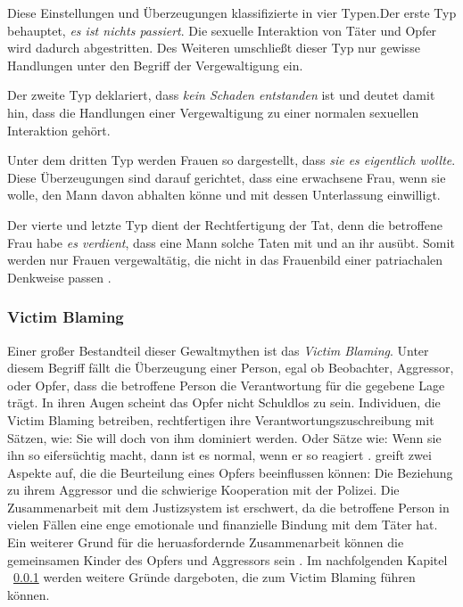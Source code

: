 Diese Einstellungen und Überzeugungen klassifizierte \textcite{Vergewaltigung_Typen_Burt_1991} in vier Typen.Der erste Typ behauptet, \textit{es ist nichts passiert}. Die sexuelle Interaktion von Täter und Opfer wird dadurch abgestritten. Des Weiteren umschließt dieser Typ nur gewisse Handlungen unter den Begriff der Vergewaltigung ein. 

Der zweite Typ deklariert, dass \textit{kein Schaden entstanden} ist und deutet damit hin, dass die Handlungen einer Vergewaltigung zu einer normalen sexuellen Interaktion gehört.

Unter dem dritten Typ werden Frauen so dargestellt, dass \textit{sie es eigentlich wollte}. Diese Überzeugungen sind darauf gerichtet, dass eine erwachsene Frau, wenn sie wolle, den Mann davon abhalten könne und mit dessen Unterlassung einwilligt.

Der vierte und letzte Typ dient der Rechtfertigung der Tat, denn die betroffene Frau habe \textit{es verdient}, dass eine Mann solche Taten mit und an ihr ausübt. Somit werden nur Frauen vergewaltätig, die nicht in das Frauenbild einer patriachalen Denkweise passen \parencite{Vergewaltigung_Typen_Burt_1991}.


\subsubsection{Victim Blaming}     \label{2.1.3.2}
Einer großer Bestandteil dieser Gewaltmythen ist das \textit{Victim Blaming}. Unter diesem Begriff fällt die Überzeugung einer Person, egal ob Beobachter, Aggressor, oder Opfer, dass die betroffene Person die Verantwortung für die gegebene Lage trägt. In ihren Augen scheint das Opfer nicht Schuldlos zu sein. Individuen, die Victim Blaming betreiben, rechtfertigen ihre Verantwortungszuschreibung mit Sätzen, wie: Sie will doch von ihm dominiert werden. Oder Sätze wie: Wenn sie ihn so eifersüchtig macht, dann ist es normal, wenn er so reagiert \parencite{DVMAS_deutsch}. \textcite{victim_blaming} greift zwei Aspekte auf, die die Beurteilung eines Opfers beeinflussen können: Die Beziehung zu ihrem Aggressor und die schwierige Kooperation mit der Polizei. Die Zusammenarbeit mit dem Justizsystem ist erschwert, da die betroffene Person in vielen Fällen eine enge emotionale und finanzielle Bindung mit dem Täter hat. Ein weiterer Grund für die heruasfordernde Zusammenarbeit können die gemeinsamen Kinder des Opfers und Aggressors sein \parencite{victim_blaming}. Im nachfolgenden Kapitel ~\ref{2.1.3.2} werden weitere Gründe dargeboten, die zum Victim Blaming führen können.


